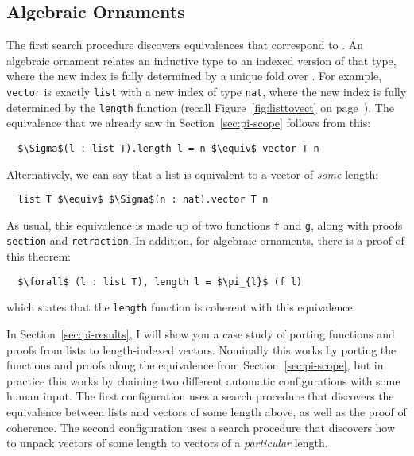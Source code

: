 \subsection{Algebraic Ornaments}
\label{sec:alg-orn}


The first search procedure discovers equivalences that correspond to .
An algebraic ornament relates an inductive type to an indexed version of that type,
where the new index is fully determined by a unique fold over \Aa. 
For example, \lstinline{vector} is exactly \lstinline{list} with a new index of type \lstinline{nat},
where the new index is fully determined by the \lstinline{length} function (recall Figure~\ref{fig:listtovect} on page~\pageref{fig:listtovect}).
The equivalence that we already saw in Section~\ref{sec:pi-scope} follows from this:

\begin{lstlisting}
  $\Sigma$(l : list T).length l = n $\equiv$ vector T n
\end{lstlisting}
Alternatively, we can say that a list is equivalent to a vector of \textit{some} length:

\begin{lstlisting}
  list T $\equiv$ $\Sigma$(n : nat).vector T n
\end{lstlisting}
As usual, this equivalence is made up of two functions \lstinline{f} and \lstinline{g}, along with proofs \lstinline{section} and \lstinline{retraction}.
In addition, for algebraic ornaments, there is a proof of this theorem:

\begin{lstlisting}
  $\forall$ (l : list T), length l = $\pi_{l}$ (f l)
\end{lstlisting}
which states that the \lstinline{length} function is coherent with this equivalence.

In Section~\ref{sec:pi-results}, I will show you a case study of porting functions and proofs from lists to length-indexed vectors.
Nominally this works by porting the functions and proofs along the equivalence from Section~\ref{sec:pi-scope},
but in practice this works by chaining two different automatic configurations with some human input.
The first configuration uses a search procedure that discovers the equivalence between lists and vectors of some length above,
as well as the proof of coherence.
The second configuration uses a search procedure that discovers how to unpack vectors of some length to vectors of a \textit{particular} length.

